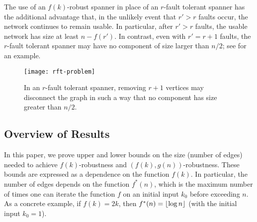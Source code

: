 \documentclass{patmorin}
\begin{document}
The use of an $f(k)$-robust spanner in place of an $r$-fault tolerant
spanner has the additional advantage that, in the unlikely event that $r'>
r$ faults occur, the network continues to remain usable.  In particular,
after $r'>r$ faults, the usable network has size at least $n-f(r')$. In
contrast, even with $r'=r+1$ faults, the $r$-fault tolerant spanner may
have no component of size larger than $n/2$; see 
for an example.

\begin{figure}
  \begin{center}
    \texttt{[image: rft-problem]}
  \end{center}
  \caption{In an $r$-fault tolerant spanner, removing $r+1$ vertices may
  disconnect the graph in such a way that no component has size greater
  than $n/2$.}
\end{figure}

%
%
%
%

\subsection{Overview of Results}

In this paper, we prove upper and lower bounds on the size (number of
edges) needed to achieve $f(k)$-robustness and $(f(k),g(n))$-robustness.
These bounds are expressed as a dependence on the function $f(k)$.
In particular, the number of edges depends on the function $f^*(n)$,
which is the maximum number of times one can iterate the function $f$ on
an initial input $k_0$ before exceeding $n$.  As a concrete example, if
$f(k)=2k$, then  $f^*(n)={\lfloor \log n \rfloor}$ (with the initial input $k_0=1$).
\end{document}
